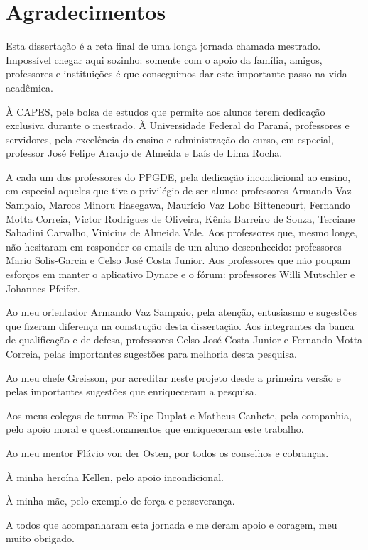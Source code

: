 \documentclass[
thesis.tex
]{subfiles}
\begin{document}
	
	\newpage
	
	\section*{Agradecimentos} %

	Esta dissertação é a reta final de uma longa jornada chamada mestrado. Impossível chegar aqui sozinho: somente com o apoio da família, amigos, professores e instituições é que conseguimos dar este importante passo na vida acadêmica.
	
	À CAPES, pele bolsa de estudos que permite aos alunos terem dedicação exclusiva durante o mestrado. À Universidade Federal do Paraná, professores e servidores, pela excelência do ensino e administração do curso, em especial, professor José Felipe Araujo de Almeida e Laís de Lima Rocha.

	A cada um dos professores do PPGDE, pela dedicação incondicional ao ensino, em especial aqueles que tive o privilégio de ser aluno: professores Armando Vaz Sampaio, Marcos Minoru Hasegawa, Maurício Vaz Lobo Bittencourt, Fernando Motta Correia, Victor Rodrigues de Oliveira, Kênia Barreiro de Souza, Terciane Sabadini Carvalho, Vinicius de Almeida Vale. Aos professores que, mesmo longe, não hesitaram em responder os emails de um aluno desconhecido: professores Mario Solis-Garcia e Celso José Costa Junior. Aos professores que não poupam esforços em manter o aplicativo Dynare e o fórum: professores Willi Mutschler e Johannes Pfeifer.
	
	Ao meu orientador Armando Vaz Sampaio, pela atenção, entusiasmo e sugestões que fizeram diferença na construção desta dissertação. Aos integrantes da banca de qualificação e de defesa, professores Celso José Costa Junior e Fernando Motta Correia, pelas importantes sugestões para melhoria desta pesquisa.

	Ao meu chefe Greisson, por acreditar neste projeto desde a primeira versão e pelas importantes sugestões que enriqueceram a pesquisa.
	
	Aos meus colegas de turma Felipe Duplat e Matheus Canhete, pela companhia, pelo apoio moral e questionamentos que enriqueceram este trabalho.
	
	Ao meu mentor Flávio von der Osten, por todos os conselhos e cobranças.
	
	À minha heroína Kellen, pelo apoio incondicional.
	
	À minha mãe, pelo exemplo de força e perseverança.
	
	A todos que acompanharam esta jornada e me deram apoio e coragem, meu muito obrigado.
	
	\thispagestyle{empty}
\end{document}
